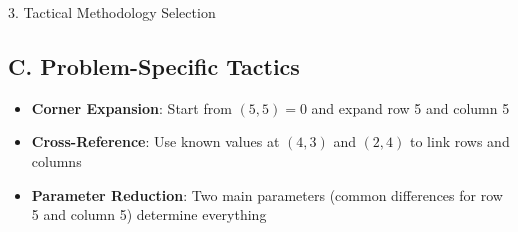 \documentclass[12pt]{article}
\begin{document}
\begin{tacticsbox}{3. Tactical Methodology Selection}
\subsection*{C. Problem-Specific Tactics}
\begin{itemize}[leftmargin=*]
    \item \textbf{Corner Expansion}: Start from $(5,5) = 0$ and expand row 5 and column 5
    
    \item \textbf{Cross-Reference}: Use known values at $(4,3)$ and $(2,4)$ to link rows and columns
    
    \item \textbf{Parameter Reduction}: Two main parameters (common differences for row 5 and column 5) determine everything
\end{itemize}

\end{tacticsbox}
\end{document}
